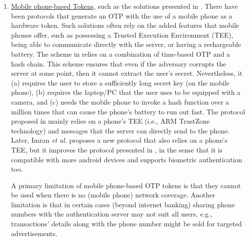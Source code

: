 \begin{enumerate}
%
\item \underline{Mobile phone-based Tokens}, such as the solutions presented in \cite{SARA22,KoganMB17,KonothFFARB20}. There have been protocols that generate an OTP with the use of a mobile phone as a hardware token. Such solutions often rely on the added features that mobile phones offer, such as possessing a Trusted Execution Environment (TEE), being able to communicate directly with the server, or having a rechargeable battery. The scheme in \cite{KoganMB17} relies on a combination of time-based OTP and a hash chain. This scheme ensures that even if the adversary corrupts the server at some point, then it cannot extract the user's secret. Nevertheless, it  (a) requires the user to store a sufficiently long secret key (on the mobile phone), (b) requires the laptop/PC that the user uses to be equipped with a camera, and (c) needs the mobile phone to invoke a hash function over a million times that can cause the phone's battery to run out fast. The protocol proposed in \cite{KonothFFARB20} mainly relies on a phone's TEE (i.e.,  ARM TrustZone technology) and messages that the server can directly send to the phone. Later,  Imran \textit{et al.} \cite{SARA22} proposes a new protocol that also relies on a phone's TEE, but it improves the protocol presented in \cite{KonothFFARB20}, in the sense that it is compatible with more android devices and supports biometric authentication too. 

A primary limitation of mobile phone-based OTP tokens is that they cannot be used when there is no (mobile phone) network coverage. Another limitation is that in certain cases (beyond internet banking) sharing phone numbers with the authentication server may not suit all users, e.g., transactions' details along with the phone number might be sold for targeted advertisements. 
%
\end{enumerate}




%







